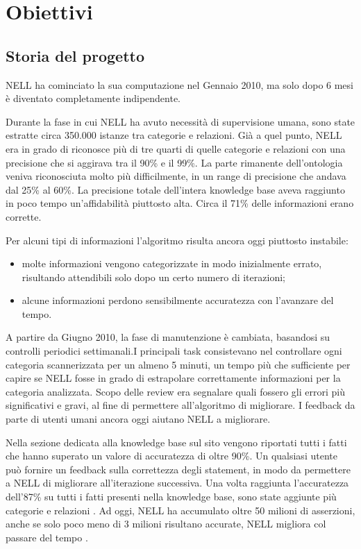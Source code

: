 \section{Obiettivi}

\subsection{Storia del progetto}
NELL ha cominciato la sua computazione nel Gennaio 2010, ma solo dopo 6 mesi è diventato completamente indipendente.

\noindent Durante la fase in cui NELL ha avuto necessità di supervisione umana, sono state estratte circa 350.000 istanze tra categorie e relazioni. Già a quel punto, NELL era in grado di riconosce più di tre quarti di quelle categorie e relazioni con una precisione che si aggirava tra il 90\% e il 99\%. La parte rimanente dell'ontologia veniva riconosciuta molto più difficilmente, in un range di precisione che andava dal 25\% al 60\%. La precisione totale dell'intera knowledge base aveva raggiunto in poco tempo un'affidabilità piuttosto alta. Circa il 71\% delle informazioni erano corrette.

\noindent Per alcuni tipi di informazioni l'algoritmo risulta ancora oggi piuttosto instabile:
\begin{itemize}
    \item molte informazioni vengono categorizzate in modo inizialmente errato, risultando attendibili solo dopo un certo numero di iterazioni;
    \item alcune informazioni perdono sensibilmente accuratezza con l'avanzare del tempo.
\end{itemize}

\noindent A partire da Giugno 2010, la fase di manutenzione è cambiata, basandosi su controlli periodici settimanali.I principali task consistevano nel controllare ogni categoria scannerizzata per un almeno 5 minuti, un tempo più che sufficiente per capire se NELL fosse in grado di estrapolare correttamente informazioni per la categoria analizzata. Scopo delle review era segnalare quali fossero gli errori più significativi e gravi, al fine di permettere all'algoritmo di migliorare. I feedback da parte di utenti umani ancora oggi aiutano NELL a migliorare.


\noindent Nella sezione dedicata alla knowledge base sul sito vengono riportati tutti i fatti che hanno superato un valore di accuratezza di oltre 90\%.\newline
Un qualsiasi utente può fornire un feedback sulla correttezza degli statement, in modo da permettere a NELL di migliorare all'iterazione successiva.
Una volta raggiunta l'accuratezza dell'87\% su tutti i fatti presenti nella knowledge base, sono state aggiunte più categorie e relazioni \cite{ReadtheWebOverview:online}.
Ad oggi, NELL ha accumulato oltre 50 milioni di asserzioni, anche se solo poco meno di 3 milioni risultano accurate, NELL migliora col passare del tempo \cite{ReadtheWeb:online}.
\newpage